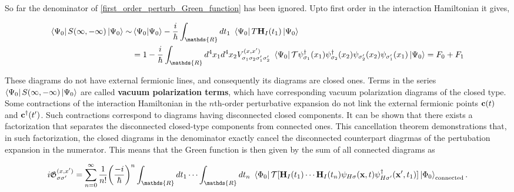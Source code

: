 \documentclass{homework}
\begin{document}
So far the denominator of \cref{first_order_perturb_Green_function} has been ignored. Upto first order in the interaction Hamiltonian it gives, 

\begin{equation}
    \begin{split}
        \bra{\Psi_0} S(\infty, -\infty) \ket{\Psi_0} \sim&
        \bra{\Psi_0} \ket{\Psi_0} - \frac{i}{\hbar} \int_{\mathds{R}} dt_1 \blanky \bra{\Psi_0} T {\bf H}_I(t_1) \ket{\Psi_0} \\
        &= 1 - \frac{i}{\hbar} \int_{\mathds{R}} d^4 x_1 d^4 x_2 V_{\sigma_1 \sigma_2 \sigma'_1 \sigma'_2}^{(x, x')} \blanky \bra{\Psi_0} \mathcal{T} 
        \psi_{\sigma_1}^\dagger(x_1)
        \psi_{\sigma_2}^\dagger(x_2)
        \psi_{\sigma'_2}(x_2)
        \psi_{\sigma'_1}(x_1)
        \ket{\Psi_0} = F_0 + F_1
    \end{split}     
\end{equation}

These diagrams do not have external fermionic lines, and consequently its diagrams are closed ones. Terms in the series $\bra{\Psi_0} S(\infty, -\infty) \ket{\Psi_0}$ are called \textbf{vacuum polarization terms}, which have corresponding vacuum polarization diagrams of the closed type. Some contractions of the interaction Hamiltonian in the $n$th-order perturbative expansion do not link the external fermionic points ${\bf c}(t)$ and ${\bf c}^\dagger(t')$. Such contractions correspond to diagrams having disconnected closed components. It can be shown that there exists a factorization that separates the disconnected closed-type components from connected ones. This cancellation theorem demonstrations that, in such factorization, the closed diagrams in the denominator exactly cancel the disconnected counterpart diagrmas of the pertubation expansion in the numerator. This means that the Green function is then given by the sum of all connected diagrams as 

\begin{equation}
    \begin{split}
        i \mathfrak{G}_{\sigma \sigma'}^{(x,x')} = \sum_{n=0}^{\infty} \frac{1}{n!} \bigg(\frac{-i}{\hbar}\bigg)^n \int_{\mathds{R}} dt_1 \cdots \int_{\mathds{R}} dt_n \blanky \bra{\Phi_0} \mathcal{T} [ {\bf H}_I(t_1) \cdots {\bf H}_I(t_n) \psi_{H \sigma}({\bf x}, t) \psi_{H \sigma'}^\dagger({\bf x}', t_1)]\ket{\Phi_0}_{\textnormal{connected}}.
    \end{split}
\end{equation}
\end{document}
